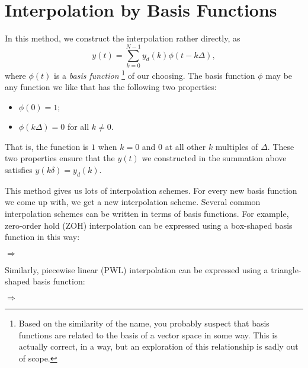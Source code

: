 \section{Interpolation by Basis Functions}

In this method, we construct the interpolation rather directly, as
\begin{equation*}
 y(t) = \sum_{k=0}^{N-1} y_d(k) \phi(t-k\Delta),
\end{equation*}
where $\phi(t)$ is a \emph{basis function}
\footnote{Based on the similarity of the name, you probably suspect that basis functions are related to the basis of a vector space in some way.
This is actually correct, in a way, but an exploration of this relationship is sadly out of scope.}
of our choosing. 
The basis function $\phi$ may be any function we like that has the following two properties:
\begin{itemize}
 \item $\phi(0)=1$;
 \item $\phi(k\Delta)=0$ for all $k\ne 0$.
\end{itemize}
That is, the function is $1$ when $k=0$ and $0$ at all other $k$ multiples of $\Delta$.
These two properties ensure that the $y(t)$ we constructed in the summation above satisfies $y(k\delta)=y_d(k)$.

This method gives us lots of interpolation schemes. 
For every new basis function we come up with, we get a new interpolation scheme. 
Several common interpolation schemes can be written in terms of basis functions.
For example, zero-order hold (ZOH) interpolation can be expressed using a box-shaped basis function in this way:

\begin{center}
{\Huge $\Longrightarrow$}
\end{center}

Similarly, piecewise linear (PWL) interpolation can be expressed using a triangle-shaped basis function:

\begin{center}
{\Huge $\Longrightarrow$}
\end{center}

